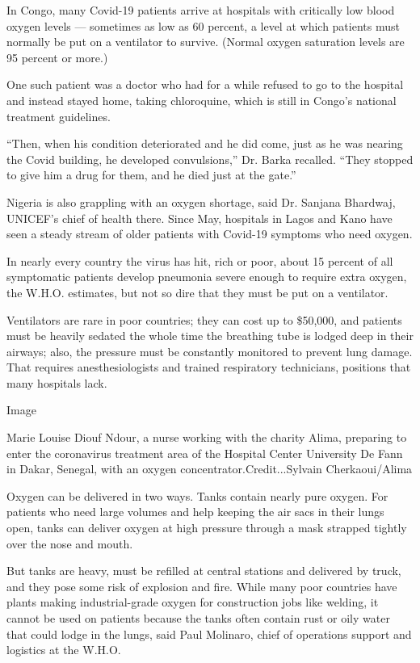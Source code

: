 In Congo, many Covid-19 patients arrive at hospitals with critically low
blood oxygen levels --- sometimes as low as 60 percent, a level at which
patients must normally be put on a ventilator to survive. (Normal oxygen
saturation levels are 95 percent or more.)

One such patient was a doctor who had for a while refused to go to the
hospital and instead stayed home, taking chloroquine, which is still in
Congo's national treatment guidelines.

``Then, when his condition deteriorated and he did come, just as he was
nearing the Covid building, he developed convulsions,'' Dr. Barka
recalled. ``They stopped to give him a drug for them, and he died just
at the gate.''

Nigeria is also grappling with an oxygen shortage, said Dr. Sanjana
Bhardwaj, UNICEF's chief of health there. Since May, hospitals in Lagos
and Kano have seen a steady stream of older patients with Covid-19
symptoms who need oxygen.

In nearly every country the virus has hit, rich or poor, about 15
percent of all symptomatic patients develop pneumonia severe enough to
require extra oxygen, the W.H.O. estimates, but not so dire that they
must be put on a ventilator.

Ventilators are rare in poor countries; they can cost up to \$50,000,
and patients must be heavily sedated the whole time the breathing tube
is lodged deep in their airways; also, the pressure must be constantly
monitored to prevent lung damage. That requires anesthesiologists and
trained respiratory technicians, positions that many hospitals lack.

Image

Marie Louise Diouf Ndour, a nurse working with the charity Alima,
preparing to enter the coronavirus treatment area of the Hospital Center
University De Fann in Dakar, Senegal, with an oxygen
concentrator.Credit...Sylvain Cherkaoui/Alima

Oxygen can be delivered in two ways. Tanks contain nearly pure oxygen.
For patients who need large volumes and help keeping the air sacs in
their lungs open, tanks can deliver oxygen at high pressure through a
mask strapped tightly over the nose and mouth.

But tanks are heavy, must be refilled at central stations and delivered
by truck, and they pose some risk of explosion and fire. While many poor
countries have plants making industrial-grade oxygen for construction
jobs like welding, it cannot be used on patients because the tanks often
contain rust or oily water that could lodge in the lungs, said Paul
Molinaro, chief of operations support and logistics at the W.H.O.

